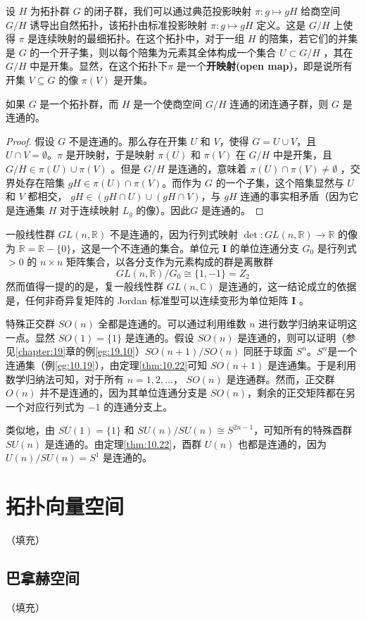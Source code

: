 	设 $H$ 为拓扑群 $G$ 的闭子群，我们可以通过典范投影映射 $\pi :g\mapsto gH$ 给商空间 $G/H$ 诱导出自然拓扑，该拓扑由标准投影映射 $\pi :g\mapsto gH$ 定义。这是 $G/H$ 上使得 $\pi $ 是连续映射的最细拓扑。在这个拓扑中，对于一组 $H$ 的陪集，若它们的并集是 $G$ 的一个开子集，则以每个陪集为元素其全体构成一个集合 $U\subset G/H$ ，其在 $G/H$ 中是开集。显然，在这个拓扑下$\pi $ 是一个\textbf{开映射(open map)}，即是说所有开集 $V\subseteq G$ 的像 $\pi (V)$ 是开集。

\begin{theorem}\label{eg:10.22}
	如果 $G$ 是一个拓扑群，而 $H$ 是一个使商空间 $G/H$ 连通的闭连通子群，则 $G$ 是连通的。
\end{theorem}

\begin{proof}
	假设 $G$ 不是连通的。那么存在开集 $U$ 和 $V$，使得 $G=U\cup V$，且 $U\cap V=\emptyset $。$\pi $ 是开映射，于是映射 $\pi (U)$ 和 $\pi (V)$ 在 $G/H$ 中是开集，且 $G/H\in \pi (U)\cup \pi (V)$ 。但是 $G/H$ 是连通的，意味着 $\pi (U)\cap \pi (V)\neq \emptyset $ ，交界处存在陪集 $gH\in \pi (U)\cap \pi (V)$。而作为 $G$ 的一个子集，这个陪集显然与 $ U$ 和 $ V$ 都相交， $gH\in (gH\cap U)\cup (gH\cap V)$，与 $gH$ 连通的事实相矛盾（因为它是连通集 $ H$ 对于连续映射 $L_{g}$ 的像）。因此$G$ 是连通的。
\end{proof}

\begin{eg}\label{eg:10.22}
	一般线性群 $GL(n,\mathbb{R} )$ 不是连通的，因为行列式映射 $\det :GL(n,\mathbb{R} )\rightarrow \mathbb{R}$ 的像为 $\dot{\mathbb{R}} =\mathbb{R} -\{0\}$，这是一个不连通的集合。单位元 $ \mathbf{I}$ 的单位连通分支 $G_{0}$ 是行列式 $  >0$ 的 $n\times n$ 矩阵集合，以各分支作为元素构成的群是离散群
\begin{equation*}
    GL(n,\mathbb{R} )/G_{0} \cong \{1,-1\}=Z_{2}
\end{equation*}
然而值得一提的的是，复一般线性群 $GL(n,\mathbb{C} )$ 是连通的，这一结论成立的依据是，任何非奇异复矩阵的 Jordan 标准型可以连续变形为单位矩阵 $ \mathbf{I}$ 。
\end{eg}

特殊正交群 $SO(n)$ 全都是连通的。可以通过利用维数 $n$ 进行数学归纳来证明这一点。显然 $SO(1)=\{1\}$ 是连通的。假设 $SO(n)$ 是连通的，则可以证明（参见\ref{chapter:19}章的例\ref{eg:19.10}）$SO(n+1)/SO(n)$ 同胚于球面 $S^{n}$。$S^{n}$是一个连通集（例\ref{eg:10.19}），由定理\ref{thm:10.22}可知 $ SO(n+1)$ 是连通集。于是利用数学归纳法可知，对于所有 $n=1,2,\dotsc $， $ SO(n)$ 是连通群。然而，正交群 $O(n)$ 并不是连通的，因为其单位连通分支是 $SO(n)$，剩余的正交矩阵都在另一个对应行列式为 $ -1$ 的连通分支上。

类似地，由 $SU(1)=\{1\}$ 和 $SU(n)/SU(n)\cong S^{2n-1}$，可知所有的特殊酉群 $SU(n)$ 是连通的。由定理\ref{thm:10.22}，酉群 $U(n)$ 也都是连通的，因为 $U(n)/SU(n)=S^{1}$ 是连通的。

\section{拓扑向量空间}
（填充）
\subsection{巴拿赫空间}
（填充）